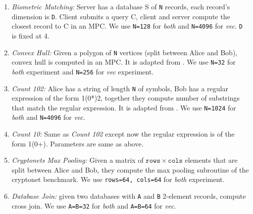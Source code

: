 

\begin{enumerate}
    \item {\em Biometric Matching:} Server has a database S of {\tt N} records, each record's dimension is {\tt D}. Client submits a query C, client and server compute the closest record to C in an MPC. We use {\tt N=128} for {\em both} and {\tt N=4096} for {\em vec}. {\tt D} is fixed at 4.
    
    
    \item {\em Convex Hull:} Given a polygon of {\tt N} vertices (split between Alice and Bob), convex hull is computed in an MPC. It is adapted from \cite{Farzan:2021}. We use {\tt N=32} for {\em both} experiment and {\tt N=256} for {\em vec} experiment.
    
    \item {\em Count 102:} Alice has a string of length {\tt N} of symbols, Bob has a regular expression of the form 1(0*)2, together they compute number of substrings that match the regular expression. It is adapted from \cite{Farzan:2021}. We use {\tt N=1024} for {\em both} and {\tt N=4096} for {\em vec}.
    
    \item {\em Count 10:} Same as {\em Count 102} except now the regular expression is of the form 1(0+). Parameters are same as above.
    
    \item {\em Cryptonets Max Pooling:} Given a matrix of $\mathtt{rows}\times\mathtt{cols}$ elements that are split between Alice and Bob, they compute the max pooling subroutine of the cryptonet benchmark\cite{Dowlin:2016}. We use {\tt rows=64, cols=64} for {\em both} experiment.

    \item {\em Database Join:} given two databases with {\tt A} and {\tt B} 2-element records, compute cross join. We use {\tt A=B=32} for {\em both} and {\tt A=B=64} for {\em vec}.
    

\end{enumerate}

